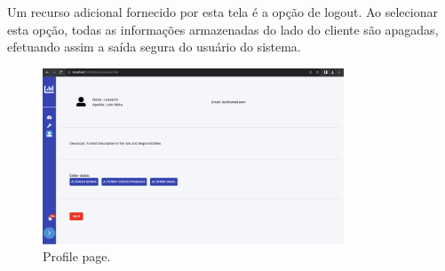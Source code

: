 Um recurso adicional fornecido por esta tela é a opção de logout. Ao selecionar esta opção, todas as informações armazenadas do lado do cliente são apagadas, efetuando assim a saída segura do usuário do sistema.

\begin{figure}[htbp]
	\centering
	\includegraphics[width=0.8\textwidth]{images/profile.png}
	\caption{Profile page.}
	\label{fig:profilePage}
\end{figure}

